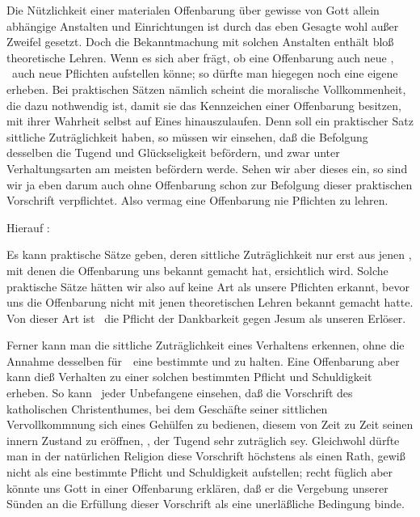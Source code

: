 Die Nützlichkeit einer materialen Offenbarung über gewisse von Gott allein abhängige Anstalten und Einrichtungen ist durch das eben Gesagte wohl außer Zweifel gesetzt. Doch die Bekanntmachung mit solchen Anstalten enthält bloß theoretische Lehren. Wenn es sich aber frägt, ob eine Offenbarung auch neue , \dh\ auch neue Pflichten aufstellen könne; so dürfte man hiegegen noch eine eigene  erheben. Bei praktischen Sätzen nämlich scheint die moralische Vollkommenheit, die dazu nothwendig ist, damit sie das Kennzeichen einer Offenbarung besitzen, mit ihrer Wahrheit selbst auf Eines hinauszulaufen. Denn soll ein praktischer Satz sittliche Zuträglichkeit haben, so müssen wir einsehen, daß die Befolgung desselben die Tugend und Glückseligkeit befördern, und zwar unter  Verhaltungsarten am meisten befördern werde. Sehen wir aber dieses ein, so sind wir ja eben darum auch ohne Offenbarung schon zur Befolgung dieser praktischen Vorschrift verpflichtet. Also vermag eine Offenbarung nie  Pflichten zu lehren.\par

Hierauf :
\begin{aufza}
\item Es kann praktische Sätze geben, deren sittliche Zuträglichkeit nur erst aus jenen , mit denen die Offenbarung uns bekannt gemacht hat, ersichtlich wird. Solche praktische Sätze hätten wir also auf keine Art als unsere Pflichten erkannt, bevor uns die Offenbarung nicht mit jenen theoretischen Lehren bekannt gemacht hatte. Von dieser Art ist \zB\ die Pflicht der Dankbarkeit gegen Jesum als unseren Erlöser.
\item Ferner kann man die sittliche Zuträglichkeit eines Verhaltens erkennen, ohne die Annahme desselben für~\ eine bestimmte  und  zu halten. Eine Offenbarung aber kann dieß Verhalten zu einer solchen bestimmten Pflicht und Schuldigkeit erheben. So kann \zB\ jeder Unbefangene einsehen, daß die Vorschrift des katholischen Christenthumes, bei dem Geschäfte seiner sittlichen Vervollkommnung sich eines Gehülfen zu bedienen, diesem von Zeit zu Zeit seinen innern Zustand zu eröffnen, \usw , der Tugend sehr zuträglich sey. Gleichwohl dürfte man in der natürlichen Religion diese Vorschrift höchstens als einen Rath, gewiß nicht als eine bestimmte Pflicht und Schuldigkeit aufstellen; recht füglich aber könnte uns Gott in einer Offenbarung erklären, daß er die Vergebung unserer Sünden an die Erfüllung dieser Vorschrift als eine unerläßliche Bedingung binde.
\end{aufza}

